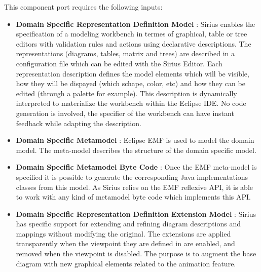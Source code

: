 \documentclass{gemoc} %
\begin{document}
This component port requires the following inputs:
\begin{itemize}
  \item \textbf{Domain Specific  Representation Definition Model} :
Sirius enables the specification of a modeling workbench in termes of graphical, table or tree editors with validation rules and actions using declarative descriptions. The representations (diagrams, tables, matrix and trees) are described in a configuration file which can be edited with the Sirius Editor. Each representation description defines the model elements which will be visible, how they will be dispayed (which schape, color, etc) and how they can be edited (through a palette for example). This description is dynamically interpreted to materialize the workbench within the Eclipse IDE. No code generation is involved, the specifier of the workbench can have instant feedback while adapting the description.  
  \item \textbf{Domain Specific Metamodel} :
Eclipse EMF is used to model the domain model. The meta-model describes the structure of the domain specific model.
  \item \textbf{Domain Specific Metamodel Byte Code} :
Once the EMF meta-model is specified it is possible to generate the corresponding Java implementations classes from this model. As Sirius relies on the EMF reflexive API, it is able to work with any kind of metamodel byte code which implements this API.
  \item \textbf{Domain Specific Representation Definition Extension Model} :
Sirius has specific support for extending and refining diagram descriptions and mappings without modifying the original. The extensions are applied transparently when the viewpoint they are defined in are enabled, and removed when the viewpoint is disabled.  The purpose is to augment the base diagram with new graphical elements related to the animation feature.
\end{itemize}
\end{document}
